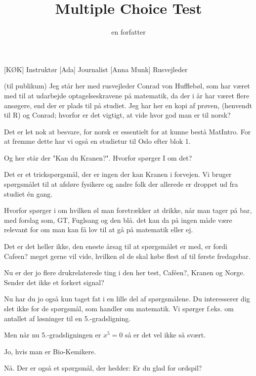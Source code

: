 \documentclass[a4paper,11pt]{article}
\title{Multiple Choice Test}
\author{en forfatter}
\begin{document}
\maketitle

\begin{roles}
[KØK] Instruktør
[Ada] Journalist
[Anna Munk] Rusvejleder
\end{roles}

\begin{sketch}
 (til publikum) Jeg står her med rusvejleder Conrad von Hufflebøl, som har været med til at udarbejde optagelseskravene på matematik, da der i år har været flere ansøgere, end der er plads til på studiet. Jeg har her en kopi af prøven, (henvendt til R) og Conrad; hvorfor er det vigtigt, at vide hvor god man er til norsk?

 Det er let nok at besvare, for norsk er essentielt for at kunne bestå MatIntro. For at fremme dette har vi også en studietur til Oslo efter blok 1.

 Og her står der "Kan du Kranen?". Hvorfor spørger I om det?

 Det er et trickspørgsmål, der er ingen der kan Kranen i forvejen. Vi bruger spørgsmålet til at afsløre fysikere og andre folk der allerede er droppet ud fra studiet én gang.

 Hvorfor spørger i om hvilken øl man foretrækker at drikke, når man tager på bar, med forslag som, GT, Fuglsang og den blå. det kan da på ingen måde være relevant for om man kan få lov til at gå på matematik eller ej.

 Det er det heller ikke, den eneste årsag til at spørgsmålet er med, er fordi Cafeen? meget gerne vil vide, hvilken øl de skal købe flest af til første fredagsbar.

 Nu er der jo flere drukrelaterede ting i den her test, Caféen?, Kranen og Norge. Sender det ikke et forkert signal?

 Nu har du jo også kun taget fat i en lille del af spørgsmålene. Du interesserer dig slet ikke for de spørgsmål, som handler om matematik. Vi spørger f.eks. om antallet af løsninger til en 5.-gradsligning.

 Men når nu 5.-gradsligningen er $x^5 = 0$ så er det vel ikke så svært.

 Jo, hvis man er Bio-Kemikere.

 Nå. Der er også et spørgsmål, der hedder: Er du glad for ordspil?


\end{sketch}
\end{document}

